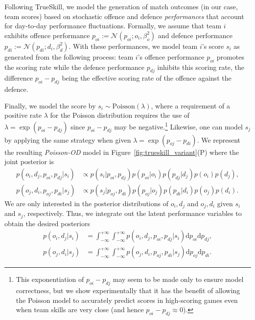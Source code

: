 \documentclass[runningheads,a4paper]{llncs}
\begin{document}
Following TrueSkill, we model the generation of match outcomes
(in our case, team scores) based on stochastic offence and defence
\emph{performances} that account for day-to-day performance
fluctuations. Formally, we assume that team $i$ exhibits offence performance
$p_{oi}:=\mathcal{N}(p_{oi}; o_i, \beta_o^2)$ and defence performance
$p_{di}:=\mathcal{N}(p_{di}; d_i, \beta_d^2)$. With these
performances, we model team $i$'s score $s_i$ as generated from the
following process: team $i$'s offence performance $p_{oi}$ promotes
the scoring rate while the defence performance $p_{dj}$ inhibits this
scoring rate, the difference $p_{oi}-p_{dj}$ being the effective
scoring rate of the offence against the defence.

Finally, we model the score by $s_{i}\sim\text{Poisson}(\lambda)$,
where a requirement of a positive rate $\lambda$ for the Poisson distribution
requires the use of $\lambda = \exp(p_{oi}-p_{dj})$ since
$p_{oi}-p_{dj}$ may be negative.\footnote{This exponentiation of
$p_{oi}-p_{dj}$ may seem to be made only to ensure model correctness,
but we show experimentally that it has the benefit of
allowing the Poisson model to accurately predict scores in
high-scoring games even when team skills are very close (and hence
$p_{oi}-p_{dj} \approx 0$).}  Likewise, one can model $s_j$ by
applying the same strategy when given $\lambda = \exp(p_{oj} - p_{di})$.
We represent the resulting \emph{Poisson-OD}
model in Figure~\ref{fig:trueskill_variant}(P) where the joint posterior
is
{\small \begin{align}%
    p(o_i, d_j, p_{oi},p_{dj} | s_i) & \propto p(s_i|p_{oi},p_{dj}) p(p_{oi}|o_i) p(p_{dj}|d_j) p(o_i)p(d_j), \nonumber \\
    p(o_j, d_i, p_{oj},p_{di} | s_j) & \propto p(s_j|p_{oj},p_{di}) p(p_{oj}|o_j) p(p_{di}|d_i) p(o_j)p(d_i). \nonumber
\end{align}}
We are only interested in the posterior distributions of $o_i,d_j$ and
$o_j,d_i$ given $s_i$ and $s_j$, respectively. Thus, we integrate
out the latent performance variables to obtain the desired posteriors
{\small
\begin{align} %
    p(o_i, d_j | s_i) &= \int_{-\infty}^{+\infty} \int_{-\infty}^{+\infty} p(o_i, d_j, p_{oi},p_{dj} | s_i)  \mathrm{d}p_{oi}\mathrm{d}p_{dj}, \nonumber \\
    p(o_j, d_i | s_j) &= \int_{-\infty}^{+\infty} \int_{-\infty}^{+\infty} p(o_j, d_i, p_{oj},p_{di} | s_j)  \mathrm{d}p_{oj}\mathrm{d}p_{di}. \nonumber
\end{align}}
\end{document}

